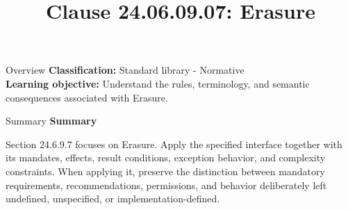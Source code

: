 \documentclass[10pt,letterpaper]{article}
\title{Clause 24.06.09.07: Erasure}
\author{}
\date{}
\begin{document}
\maketitle
\begin{CornellOverviewBox}{Overview}
\textbf{Classification:} Standard library - Normative\\[2pt]
\textbf{Learning objective:} Understand the rules, terminology, and semantic consequences associated with Erasure.
\end{CornellOverviewBox}\begin{CornellSummaryBox}{Summary}
{\sffamily\bfseries\color{Accent} Summary}\par\vspace{3pt}Section 24.6.9.7 focuses on Erasure. Apply the specified interface together with its mandates, effects, result conditions, exception behavior, and complexity constraints. When applying it, preserve the distinction between mandatory requirements, recommendations, permissions, and behavior deliberately left undefined, unspecified, or implementation-defined.
\end{CornellSummaryBox}
\end{document}
